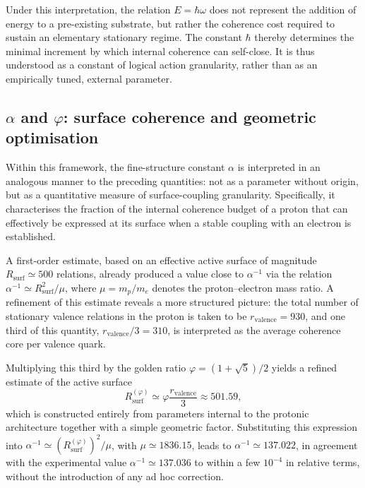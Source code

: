 \documentclass[11pt,a4paper]{article}
\begin{document}
Under this interpretation, the relation \(E = \hbar \omega\) does not represent the addition of energy to a pre-existing substrate, but rather the coherence cost required to sustain an elementary stationary regime. The constant \(\hbar\) thereby determines the minimal increment by which internal coherence can self-close. It is thus understood as a constant of logical action granularity, rather than as an empirically tuned, external parameter.

\subsection{\texorpdfstring{\(\alpha\)}{α} and \texorpdfstring{\(\varphi\)}{φ}: surface coherence and geometric optimisation}
Within this framework, the fine-structure constant \(\alpha\) is interpreted in an analogous manner to the preceding quantities: not as a parameter without origin, but as a quantitative measure of surface-coupling granularity. Specifically, it characterises the fraction of the internal coherence budget of a proton that can effectively be expressed at its surface when a stable coupling with an electron is established. 

A first-order estimate, based on an effective active surface of magnitude \(R_{\mathrm{surf}} \simeq 500\) relations, already produced a value close to \(\alpha^{-1}\) via the relation \(\alpha^{-1} \simeq R_{\mathrm{surf}}^{2} / \mu\), where \(\mu = m_{p}/m_{e}\) denotes the proton–electron mass ratio. A refinement of this estimate reveals a more structured picture: the total number of stationary valence relations in the proton is taken to be \(r_{\mathrm{valence}} = 930\), and one third of this quantity, \(r_{\mathrm{valence}}/3 = 310\), is interpreted as the average coherence core per valence quark. 

Multiplying this third by the golden ratio \(\varphi = (1 + \sqrt{5})/2\) yields a refined estimate of the active surface
\[
R_{\mathrm{surf}}^{(\varphi)} \simeq \varphi \frac{r_{\mathrm{valence}}}{3} \approx 501.59,
\]
which is constructed entirely from parameters internal to the protonic architecture together with a simple geometric factor. Substituting this expression into \(\alpha^{-1} \simeq \left(R_{\mathrm{surf}}^{(\varphi)}\right)^{2}/\mu\), with \(\mu \simeq 1836.15\), leads to \(\alpha^{-1} \simeq 137.022\), in agreement with the experimental value \(\alpha^{-1} \simeq 137.036\) to within a few \(10^{-4}\) in relative terms, without the introduction of any ad hoc correction. 
\end{document}
